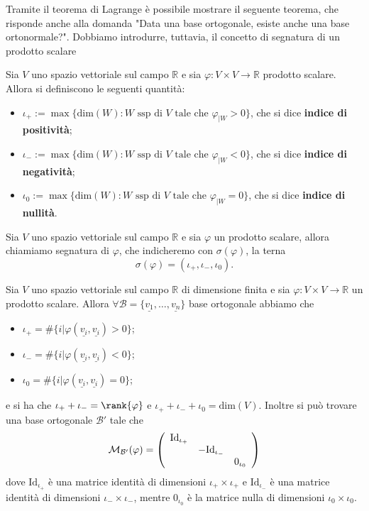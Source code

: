 Tramite il teorema di Lagrange è possibile mostrare il seguente teorema, che risponde anche alla domanda "Data una base ortogonale, esiste anche una base ortonormale?". Dobbiamo introdurre, tuttavia, il concetto di segnatura di un prodotto scalare
\begin{definition}
	Sia $V$ uno spazio vettoriale sul campo $\mathbb{R}$ e sia $\varphi: V \times V \to \mathbb{R}$ prodotto scalare. Allora si definiscono le seguenti quantità:
	\begin{itemize}
		\item $\iota_+ := \max{\{ \text{dim}(W) : W \text{ ssp di } V \text{ tale che } \varphi_{|W} > 0 \}}$, che si dice \textbf{indice di positività};
		\item $\iota_- := \max{\{ \text{dim}(W) : W \text{ ssp di } V \text{ tale che } \varphi_{|W} < 0 \}}$, che si dice \textbf{indice di negatività};
		\item $\iota_0 := \max{\{ \text{dim}(W) : W \text{ ssp di } V \text{ tale che } \varphi_{|W} = 0 \}}$, che si dice \textbf{indice di nullità}.
	\end{itemize}
\end{definition}
\begin{definition}
	Sia $V$ uno spazio vettoriale sul campo $\mathbb{R}$ e sia $\varphi$ un prodotto scalare, allora chiamiamo segnatura di $\varphi$, che indicheremo con $\sigma(\varphi)$, la terna
	$$
		\sigma(\varphi) = (\iota_+, \iota_-, \iota_0).
	$$
\end{definition}
\begin{theorem}
	Sia $V$ uno spazio vettoriale sul campo $\mathbb{R}$ di dimensione finita e sia $\varphi: V \times V \to \mathbb{R}$ un prodotto scalare. Allora $\forall \mathcal{B} = \{ \underline{v_1}, \ldots, \underline{v_n} \}$ base ortogonale abbiamo che
	\begin{itemize}
		\item[] $\iota_+ = \# \{i | \varphi(\underline{v_i}, \underline{v_i}) > 0 \}$;
		\item[] $\iota_- = \# \{i | \varphi(\underline{v_i}, \underline{v_i}) < 0 \}$;
		\item[] $\iota_0 = \# \{i | \varphi(\underline{v_i}, \underline{v_i}) = 0 \}$;
	\end{itemize}
	e si ha che $\iota_+ + \iota_- = \rank{\varphi}$ e $\iota_+ + \iota_- + \iota_0 = \text{dim}(V)$. Inoltre si può trovare una base ortogonale $\mathcal{B}'$ tale che
	\begin{align}
		\mathcal{M}_{\mathcal{B}'}(\varphi) = \left( \begin{array}{c c c} \text{Id}_{\iota_+} &  &  \\
		& -\text{Id}_{\iota_-} &  \\ 
		& & 0_{\iota_0}
		\end{array} \right)
	\end{align}
	dove $\text{Id}_{\iota_+}$ è una matrice identità di dimensioni $\iota_+ \times \iota_+$ e $\text{Id}_{\iota_-}$ è una matrice identità di dimensioni $\iota_- \times \iota_-$, mentre $0_{\iota_0}$ è la matrice nulla di dimensioni $\iota_0 \times \iota_0$.
\end{theorem}
